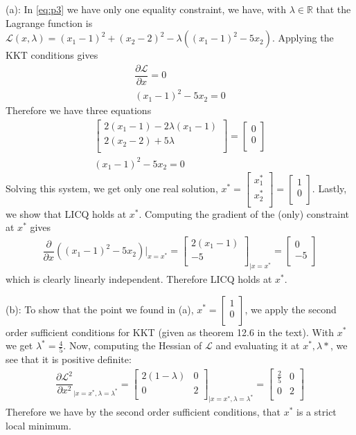 \documentclass[10pt]{article}
\newcommand{\mat}[2][ccccccccccccccc]{\left [\!\!\begin{array}{#1} #2\\ \end{array} \!\!\right]}
\newcommand{\libzptrl}[2]{\dfrac{\partial #1}{\partial #2} }
\newcommand{\eval}[2]{\bigg|_{#1}^{#2}}
\newcommand{\bbr}{\mathbb{R}}
\newcommand{\scl}{\mathcal{L}}
\begin{document}
\begin{enumerate}[leftmargin=*]
      (a):
        In \ref{eq:p3} we have only one equality constraint, we have, with $\lambda\in\bbr$  that the Lagrange function is
        $\scl(x, \lambda) = (x_1 - 1)^2 + (x_2-2)^2 - \lambda( (x_1-1)^2-5x_2)$.  Applying the KKT conditions gives
        \begin{align*}
            \libzptrl{\scl}{x}=0 \\
            (x_1-1)^2-5x_2=0
        \end{align*}
        Therefore we have three equations
        \begin{align*}
            \mat{2(x_1-1)-2\lambda(x_1-1) \\ 2(x_2-2)+5\lambda} = \mat{0\\0}\\
            (x_1-1)^2-5x_2=0
        \end{align*}
        Solving this system, we get only one real solution, $x^*=\mat{x_1^*\\x_2^*}=\mat{1\\0}$.  Lastly, we show that LICQ holds at $x^*$.  Computing the gradient of the (only) constraint at $x^*$ gives
        \begin{align*}
            \libzptrl{}{x}((x_1-1)^2-5x_2)\eval{x=x^*}{} = \mat{2(x_1-1)\\-5}_{|{x=x^*}}=\mat{0\\-5}
        \end{align*}
        which is clearly linearly independent.  Therefore LICQ holds at $x^*$.

        (b):  To show that the point we found in (a), $x^*=\mat{1\\0}$, we apply the second order sufficient conditions for KKT (given as theorem 12.6 in the text). With $x^*$ we get $\lambda^*=\frac{4}{5}$.  Now, computing the Hessian of $\scl$ and evaluating it at $x^*,\lambda*$, we see that it is positive definite:
        \begin{align*}
            \libzptrl{\scl^2}{x^2}_{|x=x^*, \lambda=\lambda^*} = \mat{ 2(1-\lambda) & 0 \\ 0 & 2  }_{|x=x^*, \lambda=\lambda^*} = \mat{\frac{2}{5} & 0 \\ 0 & 2}
         \end{align*}
         Therefore we have by the second order sufficient conditions, that $x^*$ is a strict local minimum.


\end{enumerate}
\end{document}
